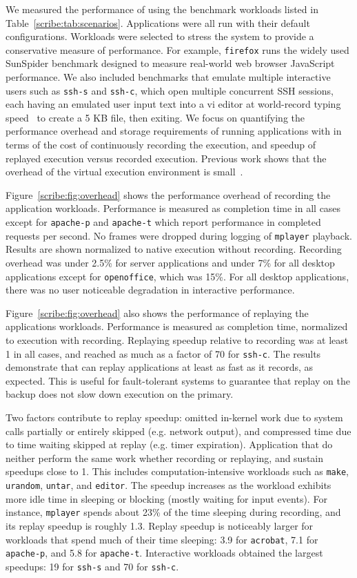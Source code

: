 We measured the performance of \scribe{} using the benchmark workloads
listed in Table~\ref{scribe:tab:scenarios}.  Applications were all run with
their default configurations.  Workloads were selected to
stress the system to provide a conservative measure of performance.
For example, {\tt firefox} runs the widely used SunSpider benchmark
designed to measure real-world web browser JavaScript performance.  
We also included benchmarks that emulate multiple interactive users
such as {\tt ssh-s} and {\tt ssh-c}, which open multiple concurrent
SSH sessions, each having an emulated user input text into a vi editor
at world-record typing speed~\cite{typist} to create a 5 KB file, then
exiting. We focus on quantifying the performance overhead and storage
requirements of running applications with \scribe{} in terms of the
cost of continuously recording the execution, and speedup of replayed
execution versus recorded execution. Previous work shows that the
overhead of the virtual execution environment is
small~\cite{zap-systor10,zap02}.

Figure~\ref{scribe:fig:overhead} shows the performance overhead of recording
the application workloads.  Performance is measured as completion time
in all cases except for {\tt apache-p} and {\tt apache-t} which report
performance in completed requests per second. No frames were dropped
during logging of {\tt mplayer} playback.  Results are shown
normalized to native execution without recording.  Recording overhead
was under 2.5\% for server applications and under 7\% for all desktop
applications except for {\tt openoffice}, which was 15\%.  For all desktop
applications, there was no user noticeable degradation in interactive
performance.

Figure~\ref{scribe:fig:overhead} also shows the performance of replaying the
applications workloads. Performance is measured as completion time,
normalized to execution with recording. Replaying speedup relative to
recording was at least 1 in all cases, and reached as much as a factor
of 70 for {\tt ssh-c}. The results demonstrate that \scribe{} can
replay applications at least as fast as it records, as expected. This
is useful for fault-tolerant systems to guarantee that replay on the
backup does not slow down execution on the primary.

Two factors contribute to replay speedup: omitted in-kernel work due
to system calls partially or entirely skipped (e.g. network output),
and compressed time due to time waiting skipped at replay (e.g. timer
expiration). Application that do neither perform the same work whether
recording or replaying, and sustain speedups close to 1. This includes
computation-intensive workloads such as {\tt make}, {\tt urandom},
{\tt untar}, and {\tt editor}. The speedup increases as the workload
exhibits more idle time in sleeping or blocking (mostly waiting for
input events). For instance, {\tt mplayer} spends about 23\% of the
time sleeping during recording, and its replay speedup is roughly
1.3. Replay speedup is noticeably larger for workloads
that spend much of their time sleeping: 3.9 for {\tt acrobat},
7.1 for {\tt apache-p}, and 5.8 for {\tt apache-t}.
Interactive workloads obtained
the largest speedups: 19 for {\tt ssh-s} and 70 for {\tt ssh-c}.

